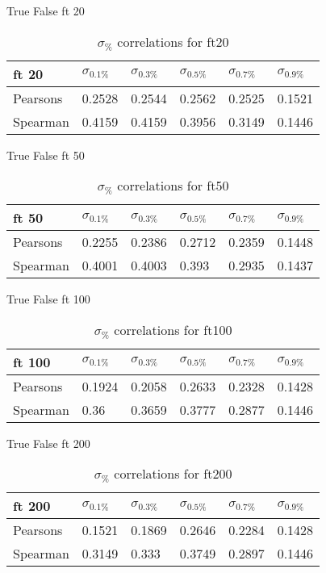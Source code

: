 \documentclass{sig-alternate}
\begin{document}
True False ft 20
\begin{table}[h!]
\centering
\caption{$\sigma_{\%}$ correlations for ft20}
\begin{tabular}{|l|l|l|l|l|l|}
\hline
ft 20 & $\sigma_{0.1\%}$ & $\sigma_{0.3\%}$ & $\sigma_{0.5\%}$ & $\sigma_{0.7\%}$ & $\sigma_{0.9\%}$ \\ \hline
Pearsons  & 0.2528 & 0.2544 & 0.2562 & 0.2525 & 0.1521 \\ \hline
Spearman  & 0.4159 & 0.4159 & 0.3956 & 0.3149 & 0.1446 \\ \hline
\end{tabular}
\end{table}
True False ft 50
\begin{table}[h!]
\centering
\caption{$\sigma_{\%}$ correlations for ft50}
\begin{tabular}{|l|l|l|l|l|l|}
\hline
ft 50 & $\sigma_{0.1\%}$ & $\sigma_{0.3\%}$ & $\sigma_{0.5\%}$ & $\sigma_{0.7\%}$ & $\sigma_{0.9\%}$ \\ \hline
Pearsons  & 0.2255 & 0.2386 & 0.2712 & 0.2359 & 0.1448 \\ \hline
Spearman  & 0.4001 & 0.4003 & 0.393 & 0.2935 & 0.1437 \\ \hline
\end{tabular}
\end{table}
True False ft 100
\begin{table}[h!]
\centering
\caption{$\sigma_{\%}$ correlations for ft100}
\begin{tabular}{|l|l|l|l|l|l|}
\hline
ft 100 & $\sigma_{0.1\%}$ & $\sigma_{0.3\%}$ & $\sigma_{0.5\%}$ & $\sigma_{0.7\%}$ & $\sigma_{0.9\%}$ \\ \hline
Pearsons  & 0.1924 & 0.2058 & 0.2633 & 0.2328 & 0.1428 \\ \hline
Spearman  & 0.36 & 0.3659 & 0.3777 & 0.2877 & 0.1446 \\ \hline
\end{tabular}
\end{table}
True False ft 200
\begin{table}[h!]
\centering
\caption{$\sigma_{\%}$ correlations for ft200}
\begin{tabular}{|l|l|l|l|l|l|}
\hline
ft 200 & $\sigma_{0.1\%}$ & $\sigma_{0.3\%}$ & $\sigma_{0.5\%}$ & $\sigma_{0.7\%}$ & $\sigma_{0.9\%}$ \\ \hline
Pearsons  & 0.1521 & 0.1869 & 0.2646 & 0.2284 & 0.1428 \\ \hline
Spearman  & 0.3149 & 0.333 & 0.3749 & 0.2897 & 0.1446 \\ \hline
\end{tabular}
\end{table}
\end{document}
